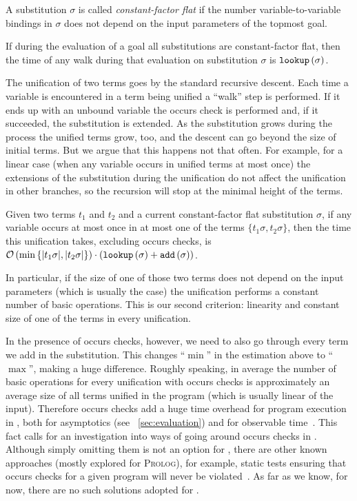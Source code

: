 \begin{definition}
A substitution $\sigma$ is called \emph{constant-factor flat} if the number variable-to-variable bindings in $\sigma$ does not depend on the input parameters of the topmost goal.
\end{definition}

\begin{lemma}
If during the evaluation of a goal all substitutions are constant-factor flat, then the time of any walk during that evaluation on substitution $\sigma$ is $\texttt{lookup}\,(\sigma)$.
\end{lemma}

The unification of two terms goes by the standard recursive descent. Each time a variable is encountered in a term being unified a ``walk'' step is performed. If it ends up with
an unbound variable the occurs check is performed and, if it succeeded, the substitution is extended. As the substitution grows during the process  the unified terms grow,
too, and the descent can go beyond the size of initial terms. But we argue that this happens not that often. For example, for a linear case (when any variable occurs in unified terms at
most once) the extensions of the substitution during the unification do not affect the unification in other branches, so the recursion will stop at the minimal height of the terms. 

\begin{lemma}
  Given two terms $t_1$ and $t_2$ and a current constant-factor flat substitution $\sigma$, if any variable occurs at most once in at most one of the terms $\{t_1 \sigma, t_2 \sigma\}$,
  then the time this unification takes, excluding occurs checks, is $\mathcal{O}\,(\min\,\{|t_1 \sigma|, |t_2 \sigma|\}) \cdot (\texttt{lookup}\,(\sigma) + \texttt{add}\,(\sigma))$.
\end{lemma}

In particular, if the size of one of those two terms does not depend on the input parameters (which is usually the case) the unification performs a constant number of basic operations.
This is our second criterion: linearity and constant size of one of the terms in every unification.

In the presence of occurs checks, however, we need to also go through every term we add in the substitution. This changes ``$\min$'' in the estimation above to ``$\max$'', making a huge
difference. Roughly speaking, in average the number of basic operations for every unification with occurs checks is approximately an average size of all terms unified in the program
(which is usually linear of the input). Therefore occurs checks add a huge time overhead for program execution in \mK, both for asymptotics (see \sectionword~\ref{sec:evaluation})
and for observable time~\cite{WillThesis}. This fact calls for an investigation into ways of going around occurs checks in \mK. Although simply omitting them is not an option for \mK,
there are other known approaches (mostly explored for \textsc{Prolog}), for example, static tests ensuring that occurs checks for a given program will never be violated~\cite{OccursCheckStaticTest}.
As far as we know, for now, there are no such solutions adopted for \mK.

